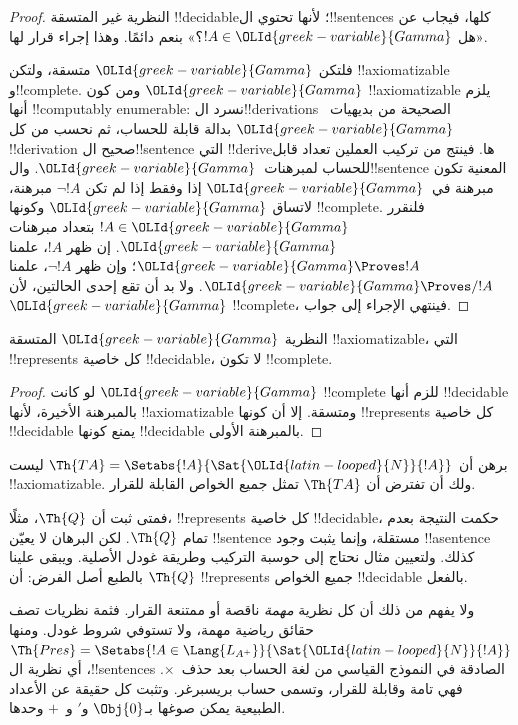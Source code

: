 \documentclass[../../../include/open-logic-section]{subfiles}
\begin{document}
\begin{proof}
النظرية غير المتسقة !!{decidable}؛ لأنها
تحتوي ال!!{sentence}s كلها، فيجاب عن
«هل $!A\in{\OLId{greek-variable}{Gamma}}$؟» بنعم دائمًا. وهذا
إجراء قرار لها.

فلتكن ${\OLId{greek-variable}{Gamma}}$ متسقة، ولتكن !!{axiomatizable}
و!!{complete}. ومن كون ${\OLId{greek-variable}{Gamma}}$
!!{axiomatizable} يلزم أنها !!{computably enumerable}:
نسرد ال!!{derivation}s الصحيحة من بديهيات~${\OLId{greek-variable}{Gamma}}$
بدالة قابلة للحساب، ثم نحسب من كل
!!{derivation} صحيح ال!!{sentence} التي
!!{derive}ها. فينتج من تركيب العملين
تعداد قابل للحساب لمبرهنات~${\OLId{greek-variable}{Gamma}}$.
وال!!{sentence} المعنية تكون مبرهنة
في~${\OLId{greek-variable}{Gamma}}$ إذا وفقط إذا لم تكن $\lnot !A$
مبرهنة، لاتساق ${\OLId{greek-variable}{Gamma}}$ وكونها !!{complete}.
فلنقرر $!A\in{\OLId{greek-variable}{Gamma}}$ بتعداد مبرهنات ${\OLId{greek-variable}{Gamma}}$.
إن ظهر $!A$، علمنا ${\OLId{greek-variable}{Gamma}}\Proves !A$؛
وإن ظهر $\lnot !A$، علمنا
${\OLId{greek-variable}{Gamma}}\Proves/ !A$. ولا بد أن تقع
إحدى الحالتين، لأن ${\OLId{greek-variable}{Gamma}}$ !!{complete}،
فينتهي الإجراء إلى جواب.
\end{proof}

\begin{cor}
النظرية ${\OLId{greek-variable}{Gamma}}$ المتسقة !!{axiomatizable}، التي
!!{represents} كل خاصية !!{decidable}، لا تكون !!{complete}.
\end{cor}

\begin{proof}
لو كانت ${\OLId{greek-variable}{Gamma}}$ !!{complete} للزم أنها
!!{decidable} بالمبرهنة الأخيرة، لأنها
!!{axiomatizable} ومتسقة. إلا أن كونها
!!{represents} كل خاصية !!{decidable}
يمنع كونها !!{decidable} بالمبرهنة الأولى.
\end{proof}

\begin{prob}
برهن أن $\Th{TA}=\Setabs{!A}{\Sat{{\OLId{latin-looped}{N}}}{!A}}$ ليست
!!{axiomatizable}. ولك أن تفترض أن $\Th{TA}$ تمثل جميع الخواص
القابلة للقرار.
\end{prob}

فمتى ثبت أن $\Th{Q}$، مثلًا، !!{represents}
كل خاصية !!{decidable}، حكمت النتيجة
بعدم تمام $\Th{Q}$. لكن البرهان لا
يعيّن !!{sentence} مستقلة، وإنما يثبت
وجود !!a{sentence} كذلك. ولتعيين مثال
نحتاج إلى حوسبة التركيب وطريقة غودل الأصلية.
ويبقى علينا بالطبع أصل الفرض: أن
$\Th{Q}$ !!{represents} جميع الخواص
!!{decidable} بالفعل.

ولا يفهم من ذلك أن كل نظرية \emph{مهمة}
ناقصة أو ممتنعة القرار. فثمة نظريات
تصف حقائق رياضية مهمة، ولا تستوفي
شروط غودل. ومنها
$\Th{Pres}=\Setabs{!A\in\Lang{L_{A^+}}}{\Sat{{\OLId{latin-looped}{N}}}{!A}}$،
أي نظرية ال!!{sentence}s الصادقة في
النموذج القياسي من لغة الحساب بعد حذف~$\times$.
فهي تامة وقابلة للقرار، وتسمى حساب بريسبرغر.
وتثبت كل حقيقة عن الأعداد الطبيعية يمكن
صوغها بـ$\Obj{0}$ و$\prime$ و~$+$ وحدها.
\end{document}
